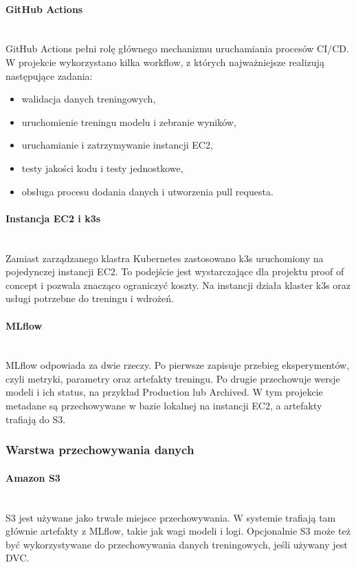 \paragraph{GitHub Actions}\mbox{}\\
GitHub Actions pełni rolę głównego mechanizmu uruchamiania procesów CI/CD. W projekcie wykorzystano kilka workflow, z których najważniejsze realizują następujące zadania:
\begin{itemize}
  \item walidacja danych treningowych,
  \item uruchomienie treningu modelu i zebranie wyników,
  \item uruchamianie i zatrzymywanie instancji EC2,
  \item testy jakości kodu i testy jednostkowe,
  \item obsługa procesu dodania danych i utworzenia pull requesta.
\end{itemize}

\paragraph{Instancja EC2 i k3s}\mbox{}\\
Zamiast zarządzanego klastra Kubernetes zastosowano k3s \cite{k3s_docs} uruchomiony na pojedynczej instancji EC2. To podejście jest wystarczające dla projektu proof of concept i pozwala znacząco ograniczyć koszty. Na instancji działa klaster k3s oraz usługi potrzebne do treningu i wdrożeń.

\paragraph{MLflow}\mbox{}\\
MLflow \cite{zaharia2018mlflow} odpowiada za dwie rzeczy. Po pierwsze zapisuje przebieg eksperymentów, czyli metryki, parametry oraz artefakty treningu. Po drugie przechowuje wersje modeli i ich status, na przykład Production lub Archived. W tym projekcie metadane są przechowywane w bazie lokalnej na instancji EC2, a artefakty trafiają do S3.

\subsubsection{Warstwa przechowywania danych}

\paragraph{Amazon S3}\mbox{}\\
S3 jest używane jako trwałe miejsce przechowywania. W systemie trafiają tam głównie artefakty z MLflow, takie jak wagi modeli i logi. Opcjonalnie S3 może też być wykorzystywane do przechowywania danych treningowych, jeśli używany jest DVC.

